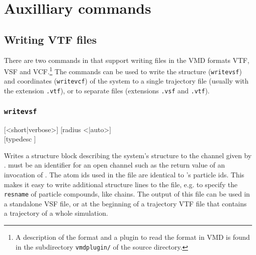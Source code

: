 \chapter{Auxilliary commands}
\label{chap:aux}

\section{Writing VTF files}

There are two commands in \es{} that support writing files in the VMD
formats VTF, VSF and VCF.\footnote{A description of the format and a
  plugin to read the format in VMD is found in the subdirectory
  \texttt{vmdplugin/} of the \es{} source directory.} The commands can
be used to write the structure (\texttt{writevsf}) and coordinates
(\texttt{writevcf}) of the system to a single trajectory file (usually
with the extension \texttt{.vtf}), or to separate files (extensions
\texttt{.vsf} and \texttt{.vtf}).

\subsection{\texttt{writevsf}}

{ [<short|verbose>] [radius <|auto>]\\{} [typedesc ]}

Writes a structure block describing the system's structure to the
channel given by .  must be an
identifier for an open channel such as the return value of an
invocation of . The atom ids used in the file are
identical to \es's particle ids.  This makes it easy to write
additional structure lines to the file, e.g. to specify the
\texttt{resname} of particle compounds, like chains.  The output of
this file can be used in a standalone VSF file, or at the beginning of
a trajectory VTF file that contains a trajectory of a whole
simulation.

